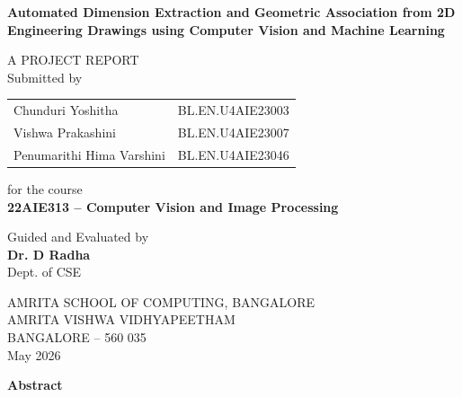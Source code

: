 \documentclass[12pt,a4paper]{article}
\begin{document}
\begin{titlepage}
\centering
\vspace*{1cm}

{\LARGE\bfseries Automated Dimension Extraction and Geometric Association from 2D Engineering Drawings using Computer Vision and Machine Learning}

\vspace{1.5cm}

{\large A PROJECT REPORT}\\[0.3cm]
{\large Submitted by}

\vspace{0.8cm}

\begin{tabular}{ll}
Chunduri Yoshitha & BL.EN.U4AIE23003 \\
Vishwa Prakashini & BL.EN.U4AIE23007 \\
Penumarithi Hima Varshini & BL.EN.U4AIE23046 \\
\end{tabular}

\vspace{1cm}

{\large for the course}\\[0.3cm]
{\large\bfseries 22AIE313 -- Computer Vision and Image Processing}

\vspace{1cm}

{\large Guided and Evaluated by}\\[0.3cm]
{\large\bfseries Dr. D Radha}\\
Dept. of CSE

\vspace{1.5cm}

{\large AMRITA SCHOOL OF COMPUTING, BANGALORE}\\
{\large AMRITA VISHWA VIDHYAPEETHAM}\\
{\large BANGALORE -- 560 035}\\[0.5cm]
{\large May 2026}

\end{titlepage}

\newpage
\begin{center}
{\Large\bfseries Abstract}
\end{center}
\end{document}
